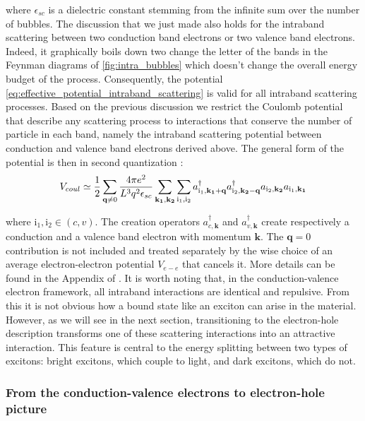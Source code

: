 where $\epsilon_{sc}$ is a dielectric constant stemming from the infinite sum over the number of bubbles. The discussion that we just made also holds for the intraband scattering between two conduction band electrons or two valence band electrons.
Indeed, it graphically boils down two change the letter of the bands in the Feynman diagrams of \autoref{fig:intra_bubbles} which doesn't change the overall energy budget of the process. Consequently, the potential \eqref{eq:effective_potential_intraband_scattering} is valid for all intraband scattering processes.
Based on the previous discussion we restrict the Coulomb potential that describe any scattering process to interactions that conserve the number of particle in each band, namely the intraband scattering potential between conduction and valence band electrons derived above.
The general form of the potential is then in second quantization :
\begin{equation}
    V_{coul}\simeq \dfrac{1}{2}\sum_{\textbf{q}\neq 0}\dfrac{4\pi e^2}{L^3q^2\epsilon_{sc}}\sum_{\mathbf{k_{1}, k_{2}}}\sum_{\mathrm{i_1,i_2}} a^{\dagger}_{\mathrm{i_{1}},\mathbf{k_1+q}}a^{\dagger}_{\mathrm{i_{2}},\mathbf{k_2-q}}a_{\mathrm{i_{2}},\mathbf{k_2}}a_{\mathrm{i_{1}},\mathbf{k_1}}
\end{equation}

\noindent where $\mathrm{i_1,i_2} \in (c,v)$. The creation operators $a^{\dagger}_{c,\mathbf{k}}$ and $a^{\dagger}_{v,\mathbf{k}}$ create respectively a conduction and a valence band electron with momentum $\mathbf{k}$.
The $\textbf{q}=0$ contribution is not included and treated separately by the wise choice of an average electron-electron potential $V_{e-e}$ that cancels it. More details can be found in the Appendix of \cite{Combescot_cooper_excitons_2015}.
It is worth noting that, in the conduction-valence electron framework, all intraband interactions are identical and repulsive. From this it is not obvious how a bound state like an exciton can arise in the material. However, as we will see in the next section, transitioning to the electron-hole description transforms one of these scattering interactions into an attractive interaction.
 This feature is central to the energy splitting between two types of excitons: bright excitons, which couple to light, and dark excitons, which do not.

\subsubsection{From the conduction-valence electrons to electron-hole picture}

